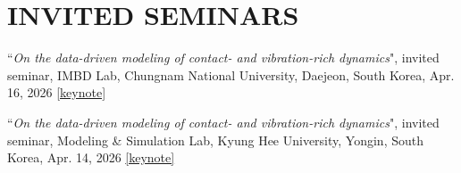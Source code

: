 \documentclass[a4paper,10pt]{extarticle}
\begin{document}
\section*{INVITED SEMINARS}
\begin{etaremune}[leftmargin=.5cm, itemsep=0.05cm]
\item ``\textsl{On the data-driven modeling of contact- and vibration-rich dynamics}", invited seminar, IMBD Lab, Chungnam National University, Daejeon, South Korea, Apr. 16, 2026 \href{https://drive.google.com/file/d/1NrgUaUlQ5dAOx_Jav5x5ZCGPavyc7Ayj/view?usp=sharing}{[keynote]}
\item ``\textsl{On the data-driven modeling of contact- and vibration-rich dynamics}", invited seminar, Modeling \& Simulation Lab, Kyung Hee University, Yongin, South Korea, Apr. 14, 2026 \href{https://drive.google.com/file/d/1NrgUaUlQ5dAOx_Jav5x5ZCGPavyc7Ayj/view?usp=sharing}{[keynote]}
\end{etaremune}



\setlength{\itemsep}{10pt} %
\end{document}
